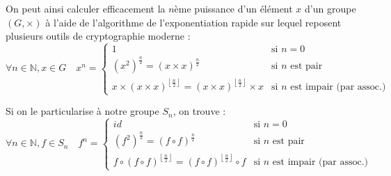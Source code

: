 \documentclass[11pt,a4paper,oneside]{book}
\begin{document}
On peut ainsi calculer efficacement la $n$ème puissance d'un élément $x$ d'un
groupe $(G, \times)$ à l'aide de l'algorithme de l'exponentiation rapide sur
lequel reposent plusieurs outils de cryptographie moderne :
\[
	\forall n \in \mathbb{N}, x \in G \quad
	x^n = \left\{\begin{array}{ll}
		1 &
			\text{si $n=0$} \\
		\left(x^2\right)^{\frac n2} = \left(x\times x\right)^{\frac n2} &
			\text{si $n$ est pair} \\
		x\times \left(x\times x\right)^{\left\lfloor\frac n2\right\rfloor} =
		\left(x\times x\right)^{\left\lfloor\frac n2\right\rfloor}\times x &
			\text{si $n$ est impair (par assoc.)}
	\end{array}\right.
\]

Si on le particularise à notre groupe $S_n$, on trouve : \[
	\forall n \in \mathbb{N}, f \in S_n \quad
	f^n = \left\{\begin{array}{ll}
		id &
			\text{si $n=0$} \\
		\left(f^2\right)^{\frac n2} = \left(f\circ f\right)^{\frac n2} &
			\text{si $n$ est pair} \\
		f\circ \left(f\circ f\right)^{\left\lfloor\frac n2\right\rfloor} =
		\left(f\circ f\right)^{\left\lfloor\frac n2\right\rfloor}\circ f &
			\text{si $n$ est impair (par assoc.)}
	\end{array}\right.
\]





\end{document}
